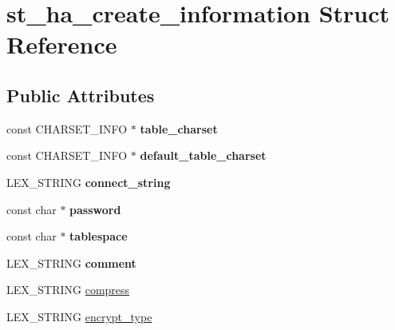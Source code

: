 \hypertarget{structst__ha__create__information}{}\section{st\+\_\+ha\+\_\+create\+\_\+information Struct Reference}
\label{structst__ha__create__information}
\subsection*{Public Attributes}
\begin{DoxyCompactItemize}
\item 
\mbox{\label{structst__ha__create__information_a13530101f441a1f9b7bed35865701f3f}} 
const C\+H\+A\+R\+S\+E\+T\+\_\+\+I\+N\+FO $\ast$ {\bfseries table\+\_\+charset}
\item 
\mbox{\label{structst__ha__create__information_a1176bb70fa8bec45685a200a8435c3ee}} 
const C\+H\+A\+R\+S\+E\+T\+\_\+\+I\+N\+FO $\ast$ {\bfseries default\+\_\+table\+\_\+charset}
\item 
\mbox{\label{structst__ha__create__information_a139c0da698751425fa539156dda74a33}} 
L\+E\+X\+\_\+\+S\+T\+R\+I\+NG {\bfseries connect\+\_\+string}
\item 
\mbox{\label{structst__ha__create__information_a870718495dc66c12dd9477f9e88fd64b}} 
const char $\ast$ {\bfseries password}
\item 
\mbox{\label{structst__ha__create__information_a43ec157af2e518bbd85940dc2a25be93}} 
const char $\ast$ {\bfseries tablespace}
\item 
\mbox{\label{structst__ha__create__information_acfbf94ffaf52fbb7bd5318d6ac2d2f75}} 
L\+E\+X\+\_\+\+S\+T\+R\+I\+NG {\bfseries comment}
\item 
L\+E\+X\+\_\+\+S\+T\+R\+I\+NG \mbox{\hyperlink{structst__ha__create__information_add80228cafe26423ea414960136cea53}{compress}}
\item 
L\+E\+X\+\_\+\+S\+T\+R\+I\+NG \mbox{\hyperlink{structst__ha__create__information_a99d5e36674a3d07fa626989b9c52d204}{encrypt\+\_\+type}}

\end{DoxyCompactItemize}
